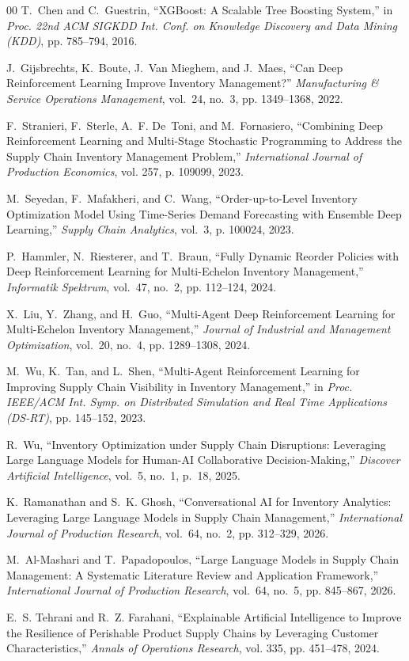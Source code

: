 \documentclass[conference]{IEEEtran}
\begin{document}
\begin{thebibliography}{00}
T.~Chen and C.~Guestrin, ``XGBoost: A Scalable Tree Boosting System,'' in \emph{Proc. 22nd ACM SIGKDD Int. Conf. on Knowledge Discovery and Data Mining (KDD)}, pp. 785--794, 2016.

J.~Gijsbrechts, K.~Boute, J.~Van Mieghem, and J.~Maes, ``Can Deep Reinforcement Learning Improve Inventory Management?'' \emph{Manufacturing \& Service Operations Management}, vol.~24, no.~3, pp. 1349--1368, 2022.

F.~Stranieri, F.~Sterle, A.~F. De~Toni, and M.~Fornasiero, ``Combining Deep Reinforcement Learning and Multi-Stage Stochastic Programming to Address the Supply Chain Inventory Management Problem,'' \emph{International Journal of Production Economics}, vol. 257, p. 109099, 2023.

M.~Seyedan, F.~Mafakheri, and C.~Wang, ``Order-up-to-Level Inventory Optimization Model Using Time-Series Demand Forecasting with Ensemble Deep Learning,'' \emph{Supply Chain Analytics}, vol.~3, p. 100024, 2023.

P.~Hammler, N.~Riesterer, and T.~Braun, ``Fully Dynamic Reorder Policies with Deep Reinforcement Learning for Multi-Echelon Inventory Management,'' \emph{Informatik Spektrum}, vol.~47, no.~2, pp. 112--124, 2024.

X.~Liu, Y.~Zhang, and H.~Guo, ``Multi-Agent Deep Reinforcement Learning for Multi-Echelon Inventory Management,'' \emph{Journal of Industrial and Management Optimization}, vol.~20, no.~4, pp. 1289--1308, 2024.

M.~Wu, K.~Tan, and L.~Shen, ``Multi-Agent Reinforcement Learning for Improving Supply Chain Visibility in Inventory Management,'' in \emph{Proc. IEEE/ACM Int. Symp. on Distributed Simulation and Real Time Applications (DS-RT)}, pp. 145--152, 2023.

R.~Wu, ``Inventory Optimization under Supply Chain Disruptions: Leveraging Large Language Models for Human-AI Collaborative Decision-Making,'' \emph{Discover Artificial Intelligence}, vol.~5, no.~1, p.~18, 2025.

K.~Ramanathan and S.~K. Ghosh, ``Conversational AI for Inventory Analytics: Leveraging Large Language Models in Supply Chain Management,'' \emph{International Journal of Production Research}, vol.~64, no.~2, pp. 312--329, 2026.

M.~Al-Mashari and T.~Papadopoulos, ``Large Language Models in Supply Chain Management: A Systematic Literature Review and Application Framework,'' \emph{International Journal of Production Research}, vol.~64, no.~5, pp. 845--867, 2026.

E.~S. Tehrani and R.~Z. Farahani, ``Explainable Artificial Intelligence to Improve the Resilience of Perishable Product Supply Chains by Leveraging Customer Characteristics,'' \emph{Annals of Operations Research}, vol. 335, pp. 451--478, 2024.

\end{thebibliography}
\end{document}
